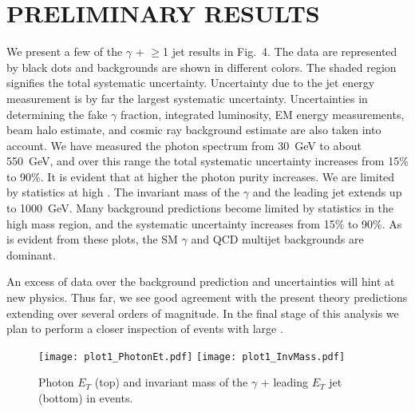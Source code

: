 \documentclass[slac_one]{revtex4}
\begin{document}
\section{PRELIMINARY RESULTS}
We present a few of the $\gamma$ + $\geq$1 jet results in Fig.~4. The data are represented by black dots and backgrounds are shown in different colors. The shaded region signifies the total systematic uncertainty. Uncertainty due to the jet energy measurement is by far the largest systematic uncertainty. Uncertainties in determining the fake $\gamma$ fraction, integrated luminosity, EM energy measurements, beam halo estimate, and cosmic ray background estimate are also taken into account. We have measured the photon \et spectrum from \mbox{30 GeV} to about \mbox{550 GeV}, and over this range the total systematic uncertainty increases from 15\% to 90\%. It is evident that at higher \et the photon purity increases.  We are limited by statistics at high \et. The invariant mass of the $\gamma$ and the leading jet extends up to \mbox{1000 GeV}. Many background predictions become limited by statistics in the high mass region, and the systematic uncertainty increases from 15\% to 90\%. As is evident from these plots, the SM $\gamma$ and QCD multijet  backgrounds are dominant.

An excess of data over the background prediction and uncertainties will hint at new physics. Thus far, we see good agreement with the present theory predictions extending over several orders of magnitude. In the final stage of this analysis we plan to perform a closer inspection of events with large \met.

\begin{figure}[tbh]\label{fig-allplots}
\centering
{} {\texttt{[image: plot1\_PhotonEt.pdf]}}
 {\texttt{[image: plot1\_InvMass.pdf]}}
\caption{Photon $E_{T}$ (top) and invariant mass of the $\gamma$ + leading $E_T$ jet (bottom) in \phoonejet events.}
\end{figure}



\end{document}
